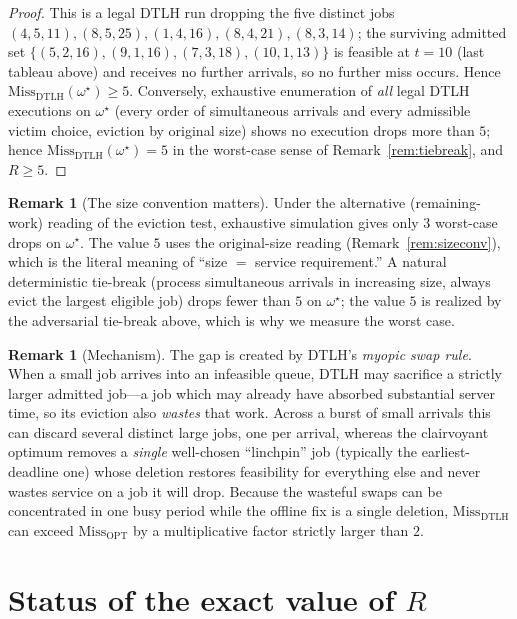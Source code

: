 \documentclass{amsart}
\theoremstyle{definition}
\newtheorem{remark}[theorem]{Remark}
\begin{document}
\begin{proof}
\smallskip
This is a legal DTLH run dropping the five distinct jobs
$(4,5,11),(8,5,25),(1,4,16),(8,4,21),(8,3,14)$; the surviving admitted set
$\{(5,2,16),(9,1,16),(7,3,18),(10,1,13)\}$ is feasible at $t=10$ (last tableau
above) and receives no further arrivals, so no further miss occurs. Hence
$\mathrm{Miss}_{\mathrm{DTLH}}(\omega^\star)\ge 5$. Conversely, exhaustive
enumeration of \emph{all} legal DTLH executions on $\omega^\star$ (every order of
simultaneous arrivals and every admissible victim choice, eviction by original
size) shows no execution drops more than $5$; hence
$\mathrm{Miss}_{\mathrm{DTLH}}(\omega^\star)=5$ in the worst-case sense of
Remark~\ref{rem:tiebreak}, and $R\ge 5$.
\end{proof}

\begin{remark}[The size convention matters]
Under the alternative (remaining-work) reading of the eviction test, exhaustive
simulation gives only $3$ worst-case drops on $\omega^\star$. The value $5$ uses
the original-size reading (Remark~\ref{rem:sizeconv}), which is the literal
meaning of ``size $=$ service requirement.'' A natural deterministic tie-break
(process simultaneous arrivals in increasing size, always evict the largest
eligible job) drops fewer than $5$ on $\omega^\star$; the value $5$ is realized
by the adversarial tie-break above, which is why we measure the worst case.
\end{remark}

\begin{remark}[Mechanism]
The gap is created by DTLH's \emph{myopic swap rule}. When a small job arrives
into an infeasible queue, DTLH may sacrifice a strictly larger admitted job---a
job which may already have absorbed substantial server time, so its eviction also
\emph{wastes} that work. Across a burst of small arrivals this can discard
several distinct large jobs, one per arrival, whereas the clairvoyant optimum
removes a \emph{single} well-chosen ``linchpin'' job (typically the
earliest-deadline one) whose deletion restores feasibility for everything else
and never wastes service on a job it will drop. Because the wasteful swaps can be
concentrated in one busy period while the offline fix is a single deletion,
$\mathrm{Miss}_{\mathrm{DTLH}}$ can exceed $\mathrm{Miss}_{\mathrm{OPT}}$ by a
multiplicative factor strictly larger than $2$.
\end{remark}

\section{Status of the exact value of $R$}
\end{document}
